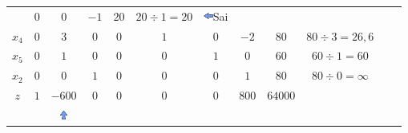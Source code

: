 \begin{frame}
{\begin{table}
\begin{tabular}{c c c c c c c c c c c c}
				& \cellcolor{gray!60}  $ \scriptstyle 0$
				& \cellcolor{gray!60}  $ \scriptstyle 0$
				& \cellcolor{gray!60}  $ \scriptstyle -1$ 
				& \cellcolor{gray!60}  $ \scriptstyle 20$
				& $ \scriptstyle 20 \div 1 = 20$ 
				& \includegraphics[width=0.3cm,height=0.3cm]{setaesquerda.jpg}\scriptsize Sai\\ 
				\cellcolor{blue!80} \color{red} $ \scriptstyle x_4$
				& \cellcolor{yellow!60}  $ \scriptstyle 0$
				& \cellcolor{gray!60}  $ \scriptstyle 3$ 
				& \cellcolor{yellow!60}  $ \scriptstyle 0$
				& \cellcolor{yellow!60}  $ \scriptstyle 0$
				& \cellcolor{yellow!60}  $ \scriptstyle 1$
				& \cellcolor{yellow!60}  $ \scriptstyle 0$
				& \cellcolor{yellow!60}  $ \scriptstyle -2$ 
				& \cellcolor{gray!60}  $ \scriptstyle 80$ 
				& $ \scriptstyle 80 \div 3 = 26,6$\\ 
				\cellcolor{blue!80} \color{red} $ \scriptstyle x_5$  
				& \cellcolor{yellow!60}  $ \scriptstyle 0$
				& \cellcolor{gray!60}  $ \scriptstyle 1$ 
				& \cellcolor{yellow!60}  $ \scriptstyle 0$
				& \cellcolor{yellow!60}  $ \scriptstyle 0$
				& \cellcolor{yellow!60}  $ \scriptstyle 0$
				& \cellcolor{yellow!60}  $ \scriptstyle 1$
				& \cellcolor{yellow!60}  $ \scriptstyle 0$ 
				& \cellcolor{gray!60}  $ \scriptstyle 60$ 
				& $ \scriptstyle 60 \div 1 = 60$\\
				\cellcolor{blue!80} \color{red} $ \scriptstyle x_2$
				& \cellcolor{yellow!60}  $ \scriptstyle 0$
				& \cellcolor{gray!60}  $ \scriptstyle 0$ 
				& \cellcolor{yellow!60}  $ \scriptstyle 1$
				& \cellcolor{yellow!60}  $ \scriptstyle 0$
				& \cellcolor{yellow!60}  $ \scriptstyle 0$
				& \cellcolor{yellow!60}  $ \scriptstyle 0$
				& \cellcolor{yellow!60}  $ \scriptstyle 1$ 
				& \cellcolor{gray!60}  $ \scriptstyle 80$ 
				& $ \scriptstyle 80 \div 0 = \infty $\\
				\cellcolor{blue!80} \color{white} $ \scriptstyle z$
				& \cellcolor{yellow!60}  $ \scriptstyle 1$
				& \cellcolor{gray!60}  $ \scriptstyle -600$ 
				& \cellcolor{yellow!60}  $ \scriptstyle 0$
				& \cellcolor{yellow!60}  $ \scriptstyle 0$
				& \cellcolor{yellow!60}  $ \scriptstyle 0$
				& \cellcolor{yellow!60}  $ \scriptstyle 0$
				& \cellcolor{yellow!60}  $ \scriptstyle 800$ 
				& \cellcolor{gray!60}  $ \scriptstyle 64000$ \\
				& & \includegraphics[width=0.3cm,height=0.3cm]{setacima.jpg} \\

\end{tabular}
\end{table}}
\end{frame}
